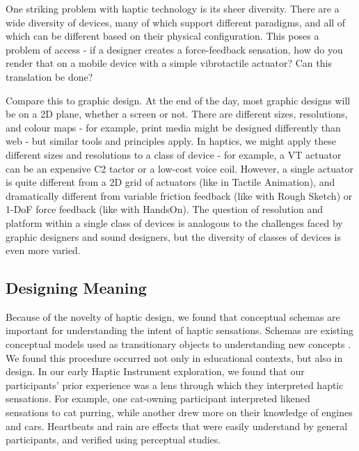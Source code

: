 One striking problem with haptic technology is its sheer diversity.
There are a wide diversity of devices, many of which support different paradigms, and all of which can be different based on their physical configuration.
This poses a problem of access - if a designer creates a force-feedback sensation, how do you render that on a mobile device with a simple vibrotactile actuator?
Can this translation be done?

Compare this to graphic design.
At the end of the day, most graphic designs will be on a 2D plane, whether a screen or not.
There are different sizes, resolutions, and colour maps - for example, print media might be designed differently than web - but similar tools and principles apply.
In haptics, we might apply these different sizes and resolutions to a class of device - for example, a VT actuator can be an expensive C2 tactor or a low-cost voice coil.
However, a single actuator is quite different from a 2D grid of actuators (like in Tactile Animation), and dramatically different from variable friction feedback (like with Rough Sketch) or 1-DoF force feedback (like with HandsOn).
The question of resolution and platform within a single class of devices is analogous to the challenges faced by graphic designers and sound designers, but the diversity of classes of devices is even more varied.




%
%
\subsection{Designing Meaning}
Because of the novelty of haptic design, we found that conceptual schemas are important for understanding the intent of haptic sensations.
Schemas are existing conceptual models used as transitionary objects to understanding new concepts \cite{Papert1980}.
We found this procedure occurred not only in educational contexts, but also in design.
In our early Haptic Instrument exploration, we found that our participants' prior experience was a lens through which they interpreted haptic sensations.
For example, one cat-owning participant interpreted likened sensations to cat purring, while another drew more on their knowledge of engines and cars.
Heartbeats and rain \cite{Israr2014} are effects that were easily understand by general participants, and verified using perceptual studies.




